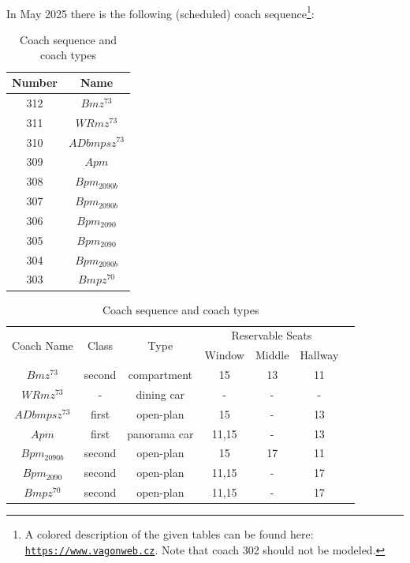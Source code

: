 \documentclass[10pt, a4paper]{article}
\begin{document}
\paragraph{}
In May 2025 there is the following (scheduled) coach sequence\footnote{A colored description of the given tables can be found here: \href{https://www.vagonweb.cz/razeni/vlak.php?zeme=\%C3\%96BB&kategorie=EC&cislo=164&nazev=Transalpin&rok=2025&lang=en}{\texttt{https://www.vagonweb.cz}}. Note that coach 302 should not be modeled.}:
\begin{table}[h]
    \centering
    \begin{tabular}{c|c} \small
    Number & Name \\ \hline \hline
        312 & $Bmz^{73}$  \\ \hline
        311 & $WRmz^{73}$ \\ \hline
        310 & $ADbmpsz^{73}$  \\ \hline
        309 & $Apm$ \\ \hline
        308 & $Bpm_{2090b}$  \\ \hline
        307 & $Bpm_{2090b}$ \\ \hline
        306 & $Bpm_{2090}$  \\ \hline
        305 & $Bpm_{2090}$ \\ \hline
        304 & $Bpm_{2090b}$  \\ \hline
        303 & $Bmpz^{70}$ \\ \hline
    \end{tabular}
    \quad
    \begin{tabular}{c|c|c|c|c|c|c}
    \multirow{2}{*}{Coach Name} & \multirow{2}{*}{Class} & \multirow{2}{*}{Type} & \multicolumn{3}{c|}{Reservable Seats}\\ 
    & & & Window& Middle &Hallway \\\hline \hline
         $Bmz^{73}$  & second & compartment & 15 & 13 & 11 \\
         $WRmz^{73}$& - & dining car & - & - & -\\
         $ADbmpsz^{73}$& first & open-plan & 15 & - & 13\\
         $Apm$& first & panorama car & 11,15 & - & 13\\
         $Bpm_{2090b}$& second & open-plan & 15 & 17 & 11\\
         $Bpm_{2090}$& second & open-plan & 11,15 & - & 17\\
         $Bmpz^{70}$& second & open-plan & 11,15 & - & 17\\
    \end{tabular}
    \caption{Coach sequence and coach types}
    \label{tab:my_label}
\end{table}
\end{document}
